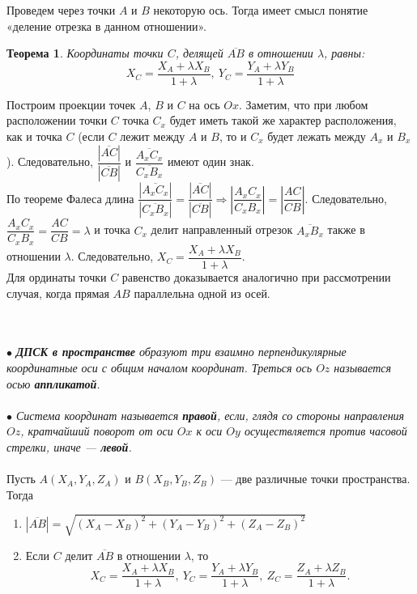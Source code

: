 Проведем через точки $A$ и $B$ некоторую ось. Тогда имеет смысл понятие «деление отрезка в данном отношении».
\newtheorem*{t2_2}{Теорема}\begin{t2_2}Координаты точки $C$, делящей $\overline{AB}$ в отношении $\lambda$, равны: $$X_C = \dfrac{X_A + \lambda X_B}{1+\lambda},\ Y_C = \dfrac{Y_A + \lambda Y_B}{1+\lambda}$$\end{t2_2}\begin{Proof}
	Построим проекции точек $A$, $B$ и $C$ на ось $Ox$. Заметим, что при любом расположении точки $C$ точка $C_x$ будет иметь такой же характер расположения, как и точка $C$ (если $C$ лежит между $A$ и $B$, то и $C_x$ будет лежать между $A_x$ и $B_x$). Следовательно, $\dfrac{|\overline{AC}|}{|\overline{CB}|}$ и $\dfrac{\overline{A_xC_x}}{\overline{C_xB_x}}$ имеют один знак.\\
	По теореме Фалеса длина $\dfrac{|\overline{A_xC_x}|}{|\overline{C_xB_x}|} = \dfrac{|\overline{AC}|}{|\overline{CB}|}\Rightarrow\left | \dfrac{A_xC_x}{C_xB_x}  \right | = \left | \dfrac{AC}{CB}  \right |$. Следовательно, $\dfrac{A_xC_x}{C_xB_x} = \dfrac{AC}{CB} = \lambda$ и точка $C_x$ делит направленный отрезок $\overline{A_xB_x}$ также в отношении $\lambda$. Следовательно, $X_C = \dfrac{X_A + \lambda X_B}{1+\lambda}$. \\Для ординаты точки $C$ равенство доказывается аналогично при рассмотрении случая, когда прямая $AB$ параллельна одной из осей.
\end{Proof}\\\\
$\bullet$ \textit{\textbf{ДПСК в пространстве} образуют три взаимно перпендикулярные координатные оси с общим началом координат.
	Треться ось $Oz$ называется осью \textbf{аппликатой}.\\\\$\bullet$
	Система координат называется \textbf{правой}, если, глядя со стороны направления $Oz$,
	кратчайший поворот от оси $Ox$ к оси $Oy$ осуществляется против часовой стрелки, иначе --- \textbf{левой}.}\\\\
Пусть $A(X_A,Y_A,Z_A)$ и $B(X_B,Y_B,Z_B)$ --- две различные точки пространства. Тогда\begin{enumerate}
	\item $|\overline{AB}| = \sqrt{(X_A - X_B)^2 + (Y_A - Y_B)^2 + (Z_A - Z_B)^2}$
	\item Если $C$ делит $\overline{AB}$ в отношении $\lambda$, то
	$$X_C = \dfrac{X_A + \lambda X_B}{1+\lambda},\ Y_C = \dfrac{Y_A + \lambda Y_B}{1+\lambda},\ Z_C = \dfrac{Z_A + \lambda Z_B}{1+\lambda}.$$
\end{enumerate}






